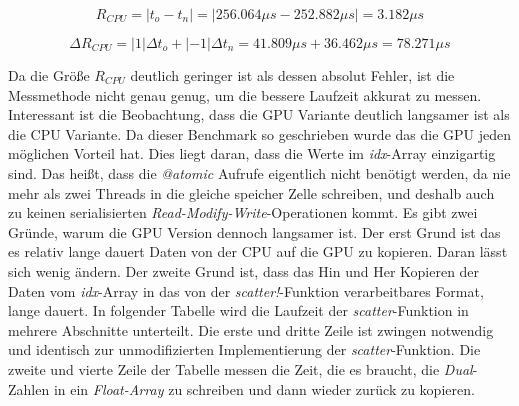 $$
R_{CPU} = |t_o - t_n| = | 256.064 \mu s - 252.882 \mu s | =  3.182 \mu s
$$

$$
\Delta R_{CPU} = | 1 | \Delta t_o + |-1| \Delta t_n  = 41.809 \mu s + 36.462 \mu s = 78.271 \mu s
$$


Da die Größe $R_{CPU}$ deutlich geringer ist als dessen absolut Fehler, ist die Messmethode nicht genau genug, um die bessere Laufzeit akkurat zu messen.
Interessant ist die Beobachtung, dass die GPU Variante deutlich langsamer ist als die CPU Variante.
Da dieser Benchmark so geschrieben wurde das die GPU jeden möglichen Vorteil hat.
Dies liegt daran, dass die Werte im \textit{idx}-Array einzigartig sind.
Das heißt, dass die \textit{@atomic} Aufrufe eigentlich nicht benötigt werden, da nie mehr als zwei Threads in die gleiche speicher Zelle schreiben,
und deshalb auch zu keinen serialisierten \textit{Read-Modify-Write}-Operationen kommt.
Es gibt zwei Gründe, warum die GPU Version dennoch langsamer ist.
Der erst Grund ist das es relativ lange dauert Daten von der CPU auf die GPU zu kopieren.
Daran lässt sich wenig ändern.
Der zweite Grund ist, dass das Hin und Her Kopieren der Daten vom \textit{idx}-Array in das von der \textit{scatter!}-Funktion verarbeitbares Format, 
lange dauert. 
In folgender Tabelle wird die Laufzeit der \textit{scatter}-Funktion in mehrere Abschnitte unterteilt.
Die erste und dritte Zeile ist zwingen notwendig und identisch zur unmodifizierten Implementierung der \textit{scatter}-Funktion.
Die zweite und vierte Zeile der Tabelle messen die Zeit, 
die es braucht, die \textit{Dual}-Zahlen in ein \textit{Float-Array} zu schreiben 
und dann wieder zurück zu kopieren.


